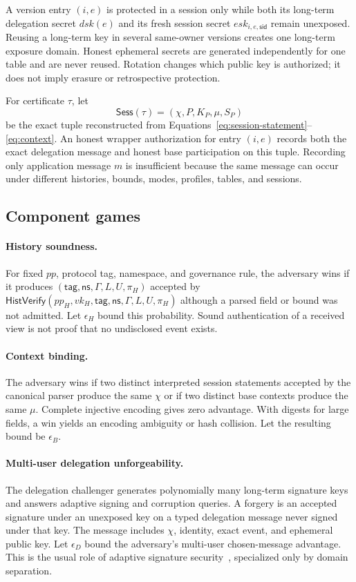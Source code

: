 \documentclass[11pt]{article}
\theoremstyle{definition}
\begin{document}
A version entry $(i,e)$ is protected in a session only while both its long-term delegation secret $dsk(e)$ and its fresh session secret $esk_{i,e,\mathsf{sid}}$ remain unexposed.  Reusing a long-term key in several same-owner versions creates one long-term exposure domain.  Honest ephemeral secrets are generated independently for one table and are never reused.  Rotation changes which public key is authorized; it does not imply erasure or retrospective protection.

For certificate $\tau$, let
\[
 \mathsf{Sess}(\tau)=(\chi,P,K_P,\mu,S_P)
\]
be the exact tuple reconstructed from Equations~\eqref{eq:session-statement}--\eqref{eq:context}.  An honest wrapper authorization for entry $(i,e)$ records both the exact delegation message and honest base participation on this tuple.  Recording only application message $m$ is insufficient because the same message can occur under different histories, bounds, modes, profiles, tables, and sessions.

\subsection{Component games}
\paragraph{History soundness.}
For fixed $pp$, protocol tag, namespace, and governance rule, the adversary wins if it produces $(\mathsf{tag},\mathsf{ns},\Gamma,L,U,\pi_H)$ accepted by $\mathsf{HistVerify}(pp_H,vk_H,\mathsf{tag},\mathsf{ns},\Gamma,L,U,\pi_H)$ although a parsed field or bound was not admitted.  Let $\epsilon_H$ bound this probability.  Sound authentication of a received view is not proof that no undisclosed event exists.

\paragraph{Context binding.}
The adversary wins if two distinct interpreted session statements accepted by the canonical parser produce the same $\chi$ or if two distinct base contexts produce the same $\mu$.  Complete injective encoding gives zero advantage.  With digests for large fields, a win yields an encoding ambiguity or hash collision.  Let the resulting bound be $\epsilon_B$.

\paragraph{Multi-user delegation unforgeability.}
The delegation challenger generates polynomially many long-term signature keys and answers adaptive signing and corruption queries.  A forgery is an accepted signature under an unexposed key on a typed delegation message never signed under that key.  The message includes $\chi$, identity, exact event, and ephemeral public key.  Let $\epsilon_D$ bound the adversary's multi-user chosen-message advantage.  This is the usual role of adaptive signature security~\cite{goldwasser1988digital}, specialized only by domain separation.
\end{document}
